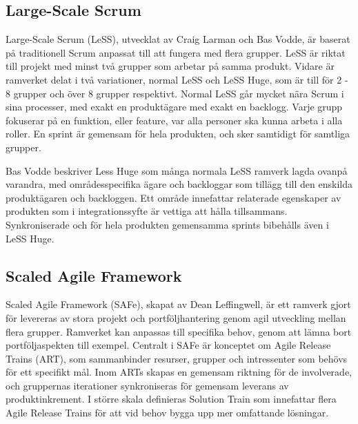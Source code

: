 	
	\subsection{Large-Scale Scrum}
	
	
		Large-Scale Scrum (LeSS), utvecklat av Craig Larman och Bas Vodde, är baserat på traditionell Scrum anpassat till att fungera med flera grupper. LeSS är riktat till projekt med minst två grupper som arbetar på samma produkt. Vidare är ramverket delat i två variationer, normal LeSS och LeSS Huge, som är till för 2 - 8 grupper och över 8 grupper respektivt. Normal LeSS går mycket nära Scrum i sina processer, med exakt en produktägare med exakt en backlogg. Varje grupp fokuserar på en funktion, eller feature, var alla personer ska kunna arbeta i alla roller. En sprint är gemensam för hela produkten, och sker samtidigt för samtliga grupper.
		
		Bas Vodde beskriver Less Huge som många normala LeSS ramverk lagda ovanpå varandra, med områdesspecifika ägare och backloggar som tillägg till den enskilda produktägaren och backloggen. Ett område innefattar relaterade egenskaper av produkten som i integrationssyfte är vettiga att hålla tillsammans. Synkroniserade och för hela produkten gemensamma sprints bibehålls även i LeSS Huge. \cite{less_overview}
			
		
			
		
	\subsection{Scaled Agile Framework}
		
		Scaled Agile Framework (SAFe), skapat av Dean Leffingwell, är ett ramverk gjort för levereras av stora projekt och portföljhantering genom agil utveckling mellan flera grupper. Ramverket kan anpassas till specifika behov, genom att lämna bort portföljaspekten till exempel.
		Centralt i SAFe är konceptet om Agile Release Trains (ART), som sammanbinder resurser, grupper och intressenter som behövs för ett specifikt mål. Inom ARTs skapas en gemensam riktning för de involverade, och gruppernas iterationer synkroniseras för gemensam leverans av produktinkrement. I större skala definieras Solution Train som innefattar flera Agile Release Trains för att vid behov bygga upp mer omfattande lösningar.
				
